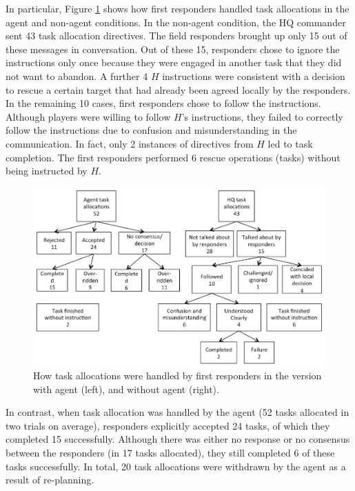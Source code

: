 In particular, Figure \ref{fig:msgs} shows how first responders handled task allocations in the agent and  non-agent conditions. In the non-agent condition, the HQ commander sent 43 task allocation directives. The field responders brought up only 15 out of these messages in conversation. Out of these 15, responders chose to ignore the instructions only once because they were engaged in another task that they did not want to abandon. A further 4 $H$ instructions were consistent with a decision to rescue a certain target that had already been agreed locally by the responders. In the remaining 10 cases, first responders chose to follow the instructions. Although players were willing to follow $H$'s instructions, they failed to correctly follow the instructions due to confusion and misunderstanding in the communication. In fact, only 2 instances of directives from $H$ led to task completion. The first responders performed 6 rescue operations (tasks) without being instructed by $H$.

\begin{figure}[t]
\includegraphics{message_handling.png}
\vspace{-5mm}
\caption{How task allocations were handled by first responders in the version with agent (left), and without agent (right).\vspace{-3mm}}\label{fig:msgs}
\end{figure}

In contrast, when task allocation was handled by the agent (52 tasks allocated in two trials on average), responders explicitly accepted 24 tasks,  of which they completed 15  successfully. Although there was either no response or no consensus between the responders (in 17 tasks allocated), they still completed 6 of these tasks successfully. In total, 20 task allocations were withdrawn by the agent as a result of re-planning. 

